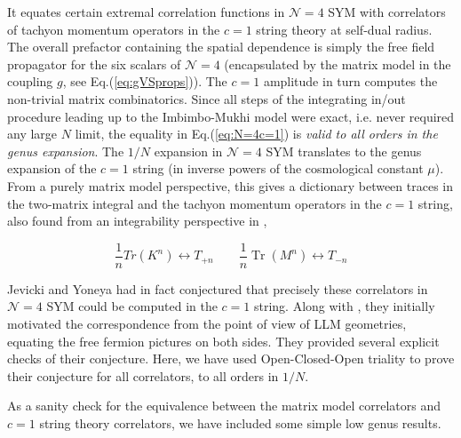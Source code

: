 \documentclass[english]{article}
\DeclareMathOperator{\Tr}{Tr}
\renewcommand{\>}{\rangle}
\newcommand{\<}{\langle}
\renewcommand{\(}{\left(}
\renewcommand{\)}{\right)}
\begin{document}
It equates certain extremal correlation functions in $\mathcal{N}=4$ SYM with correlators of tachyon momentum operators in the $c=1$ string theory at self-dual radius. The overall prefactor containing the spatial dependence is simply the free field propagator for the six scalars of $\mathcal{N}=4$ (encapsulated by the matrix model in the coupling $g$, see Eq.(\ref{eq:gVSprops})). The $c=1$ amplitude in turn computes the non-trivial matrix combinatorics. Since all steps of the integrating in/out procedure leading up to the Imbimbo-Mukhi model were exact, i.e. never required any large $N$ limit, the equality in Eq.(\ref{eq:N=4c=1}) is \textit{valid to all orders in the genus expansion}. The $1/N$ expansion in $\mathcal{N}=4$ SYM translates to the genus expansion of the $c=1$ string (in inverse powers of the cosmological constant $\mu$). From a purely matrix model perspective, this gives a dictionary between traces in the two-matrix integral and the tachyon momentum operators in the $c=1$ string, also found from an integrability perspective in \cite{BonoraXiong2matrix},

\begin{equation} \label{eq:tracesdict}
     \frac{1}{n}Tr(K^{n}) \leftrightarrow T_{+n} \qquad  \frac{1}{n}\Tr(M^{n}) \leftrightarrow T_{-n}
\end{equation} 

Jevicki and Yoneya \cite{Jevicki:2006tr} had in fact conjectured that precisely these correlators in $\mathcal{N}=4$ SYM could be computed in the $c=1$ string. Along with \cite{halfBPSc=1followup, Okuyamac=1}, they initially motivated the correspondence from the point of view of LLM geometries, equating the free fermion pictures on both sides. They provided several explicit checks of their conjecture. Here, we have used Open-Closed-Open triality to prove their conjecture for all correlators, to all orders in $1/N$. 



As a sanity check for the equivalence between the matrix model correlators and $c=1$ string theory correlators, we have included some simple low genus results. \\
\end{document}
